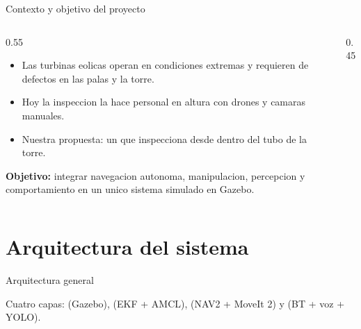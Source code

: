 \documentclass[10pt,aspectratio=169]{beamer}
\begin{document}
\begin{frame}{Contexto y objetivo del proyecto}
  \begin{columns}
    \begin{column}{0.55\textwidth}
      \begin{itemize}
        \item Las turbinas eolicas operan en condiciones extremas y requieren  de defectos en las palas y la torre.
        \item Hoy la inspeccion la hace personal en altura con drones y camaras manuales.
        \item Nuestra propuesta: un  que inspecciona desde dentro del tubo de la torre.
      \end{itemize}
      \vspace{0.5em}
      \textbf{Objetivo:} integrar navegacion autonoma, manipulacion, percepcion y comportamiento en un unico sistema simulado en Gazebo.
    \end{column}
    \begin{column}{0.45\textwidth}
    \end{column}
  \end{columns}
\end{frame}

\section{Arquitectura del sistema}

\begin{frame}{Arquitectura general}
  \vspace{-0.5em}
  \begin{block}{}
    Cuatro capas:  (Gazebo),  (EKF + AMCL),  (NAV2 + MoveIt 2) y  (BT + voz + YOLO).
  \end{block}
\end{frame}

\end{document}
